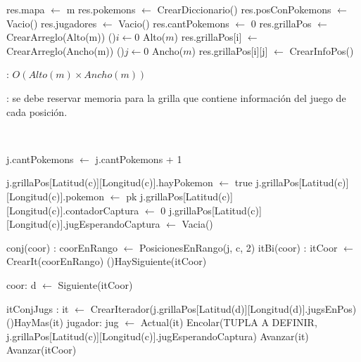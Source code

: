 \begin{Algoritmos}


	\begin{algorithm}[H]
		\NoCaptionOfAlgo
		\caption{}
		res.mapa $\leftarrow$ m
		res.pokemons $\leftarrow$ CrearDiccionario()
		res.posConPokemons $\leftarrow$ Vacio()
		res.jugadores $\leftarrow$ Vacio()
		res.cantPokemons $\leftarrow$ 0
		res.grillaPos $\leftarrow$ CrearArreglo(Alto(m))
		\For(){$i \leftarrow 0$ \KwTo Alto($m$)}{
			res.grillaPos[i] $\leftarrow$ CrearArreglo(Ancho(m))
			\For(){$j \leftarrow 0$ \KwTo Ancho($m$)}{
				res.grillaPos[i][j] $\leftarrow$ CrearInfoPos()
			}
		}
	\end{algorithm}

	\complejidad: $O(Alto(m) \times Ancho(m))$

	\justifcomp: se debe reservar memoria para la grilla que contiene información del juego de cada posición.

	~

	\begin{algorithm}[H]
		\NoCaptionOfAlgo
		\caption{}
		j.cantPokemons $\leftarrow$ j.cantPokemons + 1

		j.grillaPos[Latitud(c)][Longitud(c)].hayPokemon $\leftarrow$ true
		j.grillaPos[Latitud(c)][Longitud(c)].pokemon $\leftarrow$ pk
		j.grillaPos[Latitud(c)][Longitud(c)].contadorCaptura $\leftarrow$ 0
		j.grillaPos[Latitud(c)][Longitud(c)].jugEsperandoCaptura $\leftarrow$ Vacia()

		conj(coor) : coorEnRango $\leftarrow$ PosicionesEnRango(j, c, 2)
		itBi(coor) : itCoor $\leftarrow$ CrearIt(coorEnRango)
		\While(){HaySiguiente(itCoor)}{
			coor: d $\leftarrow$ Siguiente(itCoor)

			itConjJugs : it $\leftarrow$ CrearIterador(j.grillaPos[Latitud(d)][Longitud(d)].jugsEnPos)
			\While(){HayMas(it)}{
				jugador: jug $\leftarrow$ Actual(it)
				Encolar(TUPLA A DEFINIR, j.grillaPos[Latitud(c)][Longitud(c)].jugEsperandoCaptura)
				Avanzar(it)
			}
			Avanzar(itCoor)
		}
	\end{algorithm}


\end{Algoritmos}
